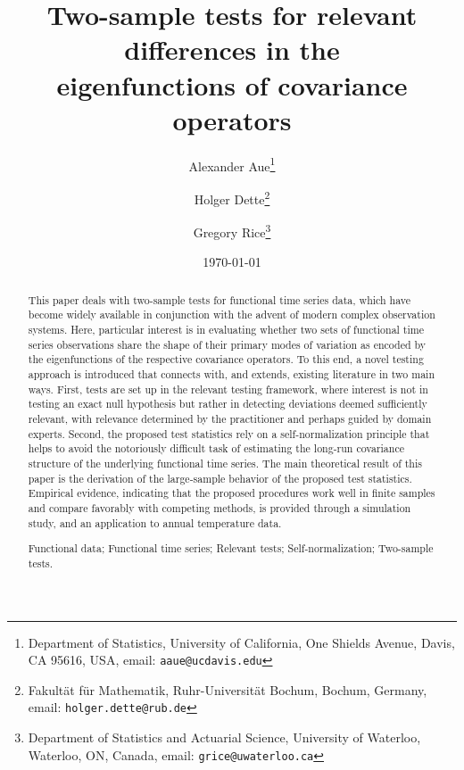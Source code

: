 \documentclass[11pt]{article}
\numberwithin{equation}{section}
\numberwithin{theorem}{section}
\numberwithin{lemma}{section}
\numberwithin{proposition}{section}
\numberwithin{cor}{section}
\numberwithin{definition}{section}
\numberwithin{cons}{section}
\numberwithin{rem}{section}
\numberwithin{exa}{section}
\numberwithin{table}{section}
\numberwithin{figure}{section}
\numberwithin{algo}{section}
\begin{document}
\title{Two-sample tests for relevant differences in the \\[.2cm]  eigenfunctions of covariance operators
}

\author{
Alexander Aue\footnote{Department of Statistics, University of California, One Shields Avenue, Davis, CA 95616, USA,  email: \tt{aaue@ucdavis.edu}}
\and Holger Dette\footnote{Fakult\"at f\"ur Mathematik, Ruhr-Universit\"at Bochum, Bochum, Germany, email: \tt{holger.dette@rub.de}}
\and Gregory Rice\footnote{Department of Statistics and Actuarial Science, University of Waterloo, Waterloo, ON, Canada, email: \tt{grice@uwaterloo.ca}}
}

\date{\today}
\maketitle
%

\begin{abstract}
\setlength{\baselineskip}{1.66em}
This paper deals with two-sample tests for functional time series data, which have become widely available in conjunction with the advent of modern complex observation systems. Here, particular interest is in evaluating whether two sets of functional time series observations share the shape of their primary modes of variation as encoded by the eigenfunctions of the respective covariance operators. To this end, a novel testing approach is introduced that connects with, and extends, existing literature in two main ways. First, tests are set up in the relevant testing framework, where interest is not in testing an exact null hypothesis but rather in detecting deviations deemed sufficiently relevant, with relevance determined by the practitioner and perhaps guided by domain experts. Second, the proposed test statistics rely on a self-normalization principle that helps to avoid the notoriously difficult task of estimating the long-run covariance structure of the underlying functional time series. The main theoretical result of this paper is the derivation of the large-sample behavior of the proposed test statistics. Empirical evidence, indicating that the proposed procedures work well in finite samples and compare favorably with competing methods, is provided through a simulation study, and an application to annual temperature data.
\medskip

 Functional data; Functional time series; Relevant tests; Self-normalization; Two-sample tests.

\end{abstract}
\end{document}

